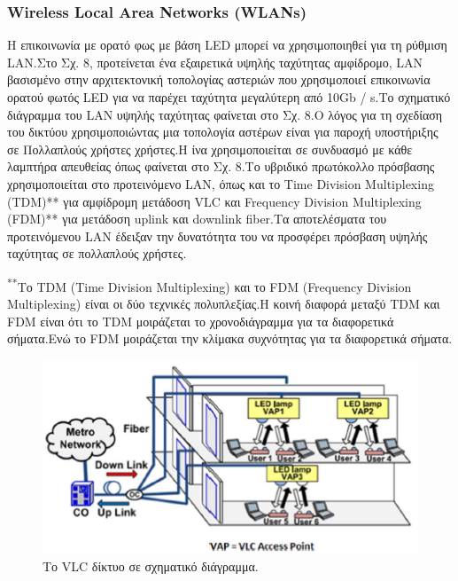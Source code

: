 \documentclass[conference]{IEEEtran}
\begin{document}
\subsubsection{Wireless Local Area Networks (WLANs)}
Η επικοινωνία με ορατό φως με βάση LED μπορεί να χρησιμοποιηθεί για τη ρύθμιση LAN.Στο   Σχ. 8, προτείνεται ένα εξαιρετικά υψηλής ταχύτητας  αμφίδρομο, LAN βασισμένο στην αρχιτεκτονική τοπολογίας αστεριών που χρησιμοποιεί επικοινωνία ορατού φωτός LED για να παρέχει ταχύτητα μεγαλύτερη από 10Gb / s.Το σχηματικό διάγραμμα του LAN υψηλής ταχύτητας φαίνεται στο Σχ. 8.Ο λόγος για τη σχεδίαση του δικτύου χρησιμοποιώντας μια τοπολογία αστέρων είναι για παροχή υποστήριξης σε Πολλαπλούς χρήστες χρήστες.Η ίνα χρησιμοποιείται σε συνδυασμό με κάθε λαμπτήρα απευθείας όπως φαίνεται στο Σχ. 8.Το υβριδικό πρωτόκολλο πρόσβασης χρησιμοποιείται στο προτεινόμενο LAN, όπως και το Time Division Multiplexing (TDM)** για αμφίδρομη μετάδοση VLC και Frequency Division Multiplexing (FDM)** για μετάδοση uplink και downlink fiber.Τα αποτελέσματα του προτεινόμενου LAN  έδειξαν  την δυνατότητα  του να προσφέρει πρόσβαση υψηλής ταχύτητας σε πολλαπλούς χρήστες.

{\footnotesize \textsuperscript{**}Το TDM (Time Division Multiplexing) και το FDM (Frequency Division Multiplexing) είναι οι δύο τεχνικές πολυπλεξίας.Η κοινή διαφορά μεταξύ TDM και FDM είναι ότι το TDM μοιράζεται το χρονοδιάγραμμα για τα διαφορετικά σήματα.Ενώ το FDM μοιράζεται την κλίμακα συχνότητας για τα διαφορετικά σήματα.}



\begin{figure}[h]
  \includegraphics[width=\linewidth]{7.png}
  \caption{Το VLC δίκτυο σε σχηματικό διάγραμμα.\cite{b1}} 
\end{figure}
\end{document}
